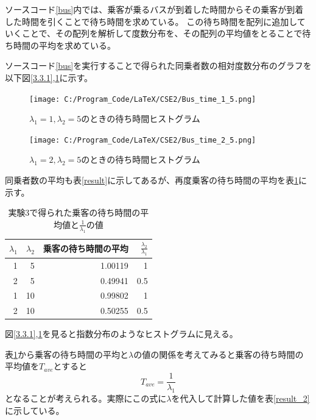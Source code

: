 \documentclass[a4paper,11pt,dvipdfmx]{jsarticle}
\begin{document}
ソースコード\ref{bus}内では、乗客が乗るバスが到着した時間からその乗客が到着した時間を引くことで待ち時間を求めている。
この待ち時間を配列に追加していくことで、その配列を解析して度数分布を、その配列の平均値をとることで待ち時間の平均を求めている。

ソースコード\ref{bus}を実行することで得られた同乗者数の相対度数分布のグラフを以下図\ref{3.3.1},\ref{3.3.2}に示す。
\begin{figure}[ht]
    \begin{minipage}[b]{0.48\columnwidth}
      \centering
      \texttt{[image: C:/Program\_Code/LaTeX/CSE2/Bus\_time\_1\_5.png]}
      \caption{$\lambda_1=1,\lambda_2=5$のときの待ち時間ヒストグラム}
      \label{3.3.1}
    \end{minipage}
    \hspace{0.04\columnwidth} 
    \begin{minipage}[b]{0.48\columnwidth}
      \centering
      \texttt{[image: C:/Program\_Code/LaTeX/CSE2/Bus\_time\_2\_5.png]}
      \caption{$\lambda_1=2,\lambda_2=5$のときの待ち時間ヒストグラム}
      \label{3.3.2}
    \end{minipage}
\end{figure}

同乗者数の平均も表\ref{result}に示してあるが、再度乗客の待ち時間の平均を表\ref{result_3}に示す。
\begin{table}[ht]
    \centering
    \caption{実験3で得られた乗客の待ち時間の平均値と$\frac{1}{\lambda_1}$の値}
    \begin{tabular}{|r|r|r|r|} \hline
        $\lambda_1$ & $\lambda_2$ & 乗客の待ち時間の平均 & $\frac{\lambda_2}{\lambda_1}$  \\ \hline
        1 & 5  & 1.00119 & 1   \\ \hline
        2 & 5  & 0.49941 & 0.5 \\ \hline
        1 & 10 & 0.99802 & 1   \\ \hline
        2 & 10 & 0.50255 & 0.5 \\ \hline
    \end{tabular}
    \label{result_3}
\end{table}

図\ref{3.3.1},\ref{3.3.2}を見ると指数分布のようなヒストグラムに見える。

表\ref{result_3}から乗客の待ち時間の平均と$\lambda$の値の関係を考えてみると乗客の待ち時間の平均値を$T_{ave}$とすると
\begin{equation}
    T_{ave} = \frac{1}{\lambda_1}
\end{equation}
となることが考えられる。実際にこの式に$\lambda$を代入して計算した値を表\ref{result_2}に示している。
\end{document}
